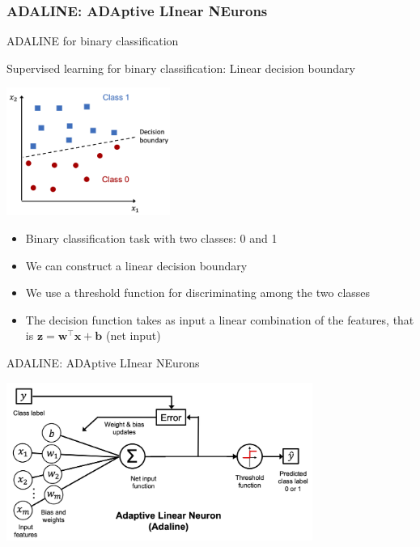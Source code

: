 \documentclass[aspectratio=169]{beamer}
\newcommand{\high}[1]{{\color{red}#1}}
\begin{document}
\begin{frame}
    \frametitle{ADALINE: ADAptive LInear NEurons}
    \begin{center}
        {\LARGE ADALINE for binary classification}
    \end{center}
\end{frame}

\begin{frame}{Supervised learning for binary classification: Linear decision boundary}
	\begin{center}    
		\includegraphics[width=0.4\textwidth]{figures/02_02.png}
	\end{center}
	\begin{itemize}
		\item Binary classification task with two classes: 0 and 1
		\item We can construct a linear decision boundary
		\item We use a threshold function for discriminating among the  two classes
		\item The decision function takes as input a linear combination of the features, that is $\mathbf{z = w^{\top}x + b}$ (net input)
	\end{itemize}
\end{frame}

\begin{frame}{ADALINE: ADAptive LInear NEurons}
	\begin{center}    
		\includegraphics[width=0.75\textwidth]{figures/02_09_new.png}
	\end{center}
\end{frame}
\end{document}
